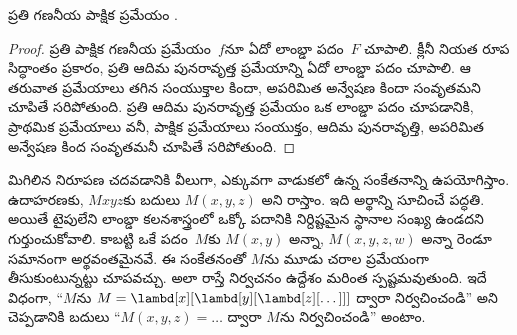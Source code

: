 \documentclass[../../../include/open-logic-section]{subfiles}
\begin{document}

\begin{thm}
ప్రతి గణనీయ పాక్షిక ప్రమేయం .
\end{thm}

\begin{proof}
ప్రతి పాక్షిక గణనీయ ప్రమేయం~$f$నూ ఏదో లాంబ్డా పదం~$F$
 చూపాలి. క్లీనీ నియత రూప సిద్ధాంతం ప్రకారం, ప్రతి ఆదిమ పునరావృత్త
ప్రమేయాన్ని ఏదో లాంబ్డా పదం  చూపాలి. ఆ తరువాత
 ప్రమేయాలు తగిన సంయుక్తాల కిందా, అపరిమిత అన్వేషణ కిందా
సంవృతమని చూపితే సరిపోతుంది. ప్రతి ఆదిమ పునరావృత్త ప్రమేయం ఒక లాంబ్డా
పదం  చూపడానికి, ప్రాథమిక ప్రమేయాలు
వనీ,  పాక్షిక ప్రమేయాలు
సంయుక్తం, ఆదిమ పునరావృత్తి, అపరిమిత అన్వేషణ కింద సంవృతమనీ చూపితే
సరిపోతుంది.
\end{proof}

మిగిలిన నిరూపణ చదవడానికి వీలుగా, ఎక్కువగా వాడుకలో ఉన్న
సంకేతనాన్ని ఉపయోగిస్తాం. ఉదాహరణకు, $Mxyz$కు బదులు $M(x, y, z)$ అని
రాస్తాం. ఇది అర్థాన్ని సూచించే పద్ధతి. అయితే టైపులేని లాంబ్డా కలనశాస్త్రంలో
ఒక్కో పదానికి నిర్దిష్టమైన స్థానాల సంఖ్య ఉండదని గుర్తుంచుకోవాలి.
కాబట్టి ఒకే పదం~$M$కు $M(x,y)$ అన్నా, $M(x,y,z,w)$ అన్నా
రెండూ సమానంగా అర్థవంతమైనవే. ఈ సంకేతనంతో $M$ను మూడు చరాల ప్రమేయంగా తీసుకుంటున్నట్టు
చూపవచ్చు. అలా రాస్తే నిర్వచనం ఉద్దేశం మరింత స్పష్టమవుతుంది. ఇదే విధంగా, ``$M$ను $M =
\lambd[x][\lambd[y][\lambd[z][\dots]]]$ ద్వారా నిర్వచించండి'' అని
చెప్పడానికి బదులు ``$M(x,y,z) = \dots$ ద్వారా $M$ను నిర్వచించండి''
అంటాం.
\end{document}
